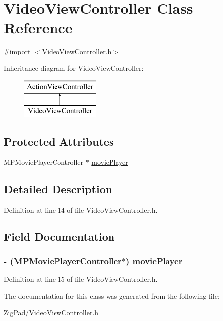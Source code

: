 \hypertarget{interface_video_view_controller}{
\section{VideoViewController Class Reference}
\label{interface_video_view_controller}
}


{\ttfamily \#import $<$VideoViewController.h$>$}

Inheritance diagram for VideoViewController:\begin{figure}[H]
\begin{center}
\leavevmode
\includegraphics[height=2.000000cm]{interface_video_view_controller}
\end{center}
\end{figure}
\subsection*{Protected Attributes}
\begin{DoxyCompactItemize}
\item 
MPMoviePlayerController $\ast$ \hyperlink{interface_video_view_controller_a86b23e45f5523e24ad725c99ce877929}{moviePlayer}
\end{DoxyCompactItemize}


\subsection{Detailed Description}


Definition at line 14 of file VideoViewController.h.



\subsection{Field Documentation}
\hypertarget{interface_video_view_controller_a86b23e45f5523e24ad725c99ce877929}{
\subsubsection[{moviePlayer}]{\setlength{\rightskip}{0pt plus 5cm}-\/ (MPMoviePlayerController$\ast$) {\bf moviePlayer}}}
\label{interface_video_view_controller_a86b23e45f5523e24ad725c99ce877929}


Definition at line 15 of file VideoViewController.h.



The documentation for this class was generated from the following file:\begin{DoxyCompactItemize}
\item 
ZigPad/\hyperlink{_video_view_controller_8h}{VideoViewController.h}\end{DoxyCompactItemize}
